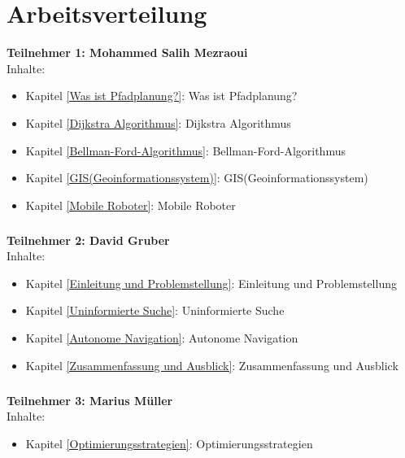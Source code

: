 \chapter*{Arbeitsverteilung}

\textbf{Teilnehmer 1: Mohammed Salih Mezraoui} 
\\
 Inhalte:
 \begin{itemize}
    \item Kapitel \ref{Was ist Pfadplanung?}: Was ist Pfadplanung?
    \item Kapitel \ref{Dijkstra Algorithmus}: Dijkstra Algorithmus
    \item Kapitel \ref{Bellman-Ford-Algorithmus}: Bellman-Ford-Algorithmus
    \item Kapitel \ref{GIS(Geoinformationssystem)}: GIS(Geoinformationssystem)
    \item Kapitel \ref{Mobile Roboter}: Mobile Roboter
\end{itemize}
\paragraph*{}
\textbf{Teilnehmer 2: David Gruber} 
\\
Inhalte: 
\begin{itemize}
    \item Kapitel \ref{Einleitung und Problemstellung}: Einleitung und Problemstellung
    \item Kapitel \ref{Uninformierte Suche}: Uninformierte Suche
    \item Kapitel \ref{Autonome Navigation}: Autonome Navigation
    \item Kapitel \ref{Zusammenfassung und Ausblick}: Zusammenfassung und Ausblick
\end{itemize}
\paragraph*{}
\textbf{Teilnehmer 3: Marius Müller} 
\\
 Inhalte: 
\begin{itemize}
	\item Kapitel \ref{Optimierungsstrategien}: Optimierungsstrategien
\end{itemize}